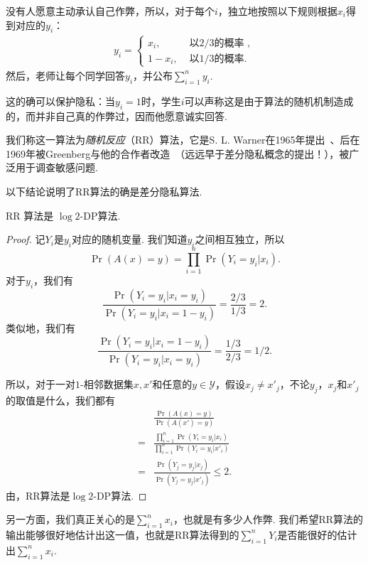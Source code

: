 没有人愿意主动承认自己作弊，所以，对于每个$i$，独立地按照以下规则根据$x_i$得到对应的$y_i$：
\[\begin{aligned}
    y_i =
    \begin{cases}
        x_i, & \text{ 以$2/3$的概率 }, \\
        1 - x_i,& \text{ 以$1/3$的概率}.
    \end{cases}
\end{aligned}\]
然后，老师让每个同学回答$y_i$，并公布$\sum_{i=1}^n y_i$. 

这的确可以保护隐私：当$y_i = 1$时，学生$i$可以声称这是由于算法的随机机制造成的，而并非自己真的作弊过，因而他愿意诚实回答. 

我们称这一算法为\textit{随机反应}（RR）算法，它是S. L. Warner在1965年提出~\cite{warnerRandomizedResponseSurvey1965}、后在1969年被Greenberg与他的合作者改造~\cite{greenbergUnrelatedQuestionRandomized1969}（远远早于差分隐私概念的提出！），被广泛用于调查敏感问题.

以下结论说明了RR算法的确是差分隐私算法.

\begin{theorem}
    RR 算法是 $\log 2$-DP算法.
\end{theorem}
\begin{proof}
记$Y_i$是$y_i$对应的随机变量. 我们知道$y_i$之间相互独立，所以
    \[
    \Pr(A(x) = y) = \prod_{i=1}^n \Pr(Y_i = y_i  | x_i).
    \]
对于$y_i$，我们有
    \[
    \frac{\Pr(Y_i = y_i  | x_i = y_i)}{\Pr(Y_i = y_i  | x_i = 1 - y_i)} = \frac{2/3}{1/3} = 2.
    \]
类似地，我们有
    \[
    \frac{\Pr(Y_i = y_i  | x_i = 1 - y_i)}{\Pr(Y_i = y_i  | x_i = y_i)} = \frac{1/3}{2/3} = 1/2.
    \]

所以，对于一对$1$-相邻数据集$x, x'$和任意的$y \in \mathcal Y$，假设$x_j \neq x'_j$，不论$y_j$，$x_j$和$x'_j$的取值是什么，我们都有
    \begin{align*}
    & \frac{\Pr(A(x) = y)}{\Pr(A(x') = y)} \\
    =& \frac{\prod_{i=1}^n \Pr(Y_i = y_i  | x_i)}{\prod_{i=1}^n \Pr(Y_i = y_i  | x'_i)} \\
    =& \frac{\Pr(Y_j = y_j  | x_j)}{\Pr(Y_j = y_j  | x'_j)}\leq 2.
    \end{align*}
由，RR算法是$\log 2$-DP算法.
\end{proof}

另一方面，我们真正关心的是$\sum_{i=1}^n x_i$，也就是有多少人作弊. 我们希望RR算法的输出能够很好地估计出这一值，也就是RR算法得到的$\sum_{i=1}^n Y_i$是否能很好的估计出$\sum_{i=1}^n x_i$. 

